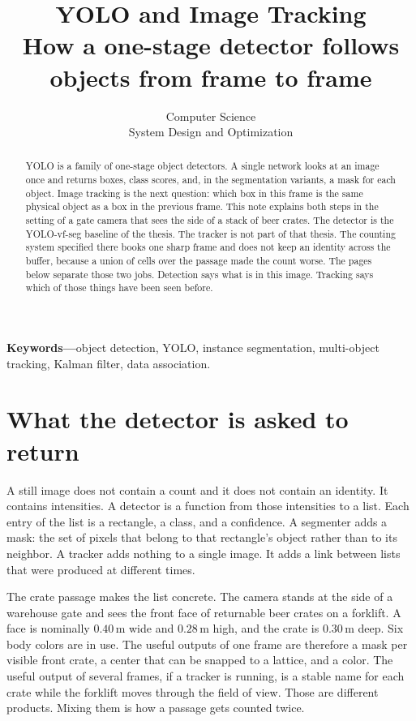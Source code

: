 \documentclass[11pt,a4paper]{article}
\title{YOLO and Image Tracking\\[0.4em]
\large How a one-stage detector follows objects from frame to frame}
\author{Computer Science\\ System Design and Optimization}
\date{}
\begin{document}
\maketitle
\thispagestyle{empty}
\vspace{-1.6em}
\noindent\textbf{Keywords---}object detection, YOLO, instance segmentation, multi-object tracking, Kalman filter, data association.

\begin{abstract}
\noindent
YOLO is a family of one-stage object detectors. A single network looks at an image once and returns boxes, class scores, and, in the segmentation variants, a mask for each object. Image tracking is the next question: which box in this frame is the same physical object as a box in the previous frame. This note explains both steps in the setting of a gate camera that sees the side of a stack of beer crates. The detector is the YOLO-vf-seg baseline of the thesis. The tracker is not part of that thesis. The counting system specified there books one sharp frame and does not keep an identity across the buffer, because a union of cells over the passage made the count worse. The pages below separate those two jobs. Detection says what is in this image. Tracking says which of those things have been seen before.
\end{abstract}

\section{What the detector is asked to return}

A still image does not contain a count and it does not contain an identity. It contains intensities. A detector is a function from those intensities to a list. Each entry of the list is a rectangle, a class, and a confidence. A segmenter adds a mask: the set of pixels that belong to that rectangle's object rather than to its neighbor. A tracker adds nothing to a single image. It adds a link between lists that were produced at different times.

The crate passage makes the list concrete. The camera stands at the side of a warehouse gate and sees the front face of returnable beer crates on a forklift. A face is nominally $0.40\,\mathrm{m}$ wide and $0.28\,\mathrm{m}$ high, and the crate is $0.30\,\mathrm{m}$ deep. Six body colors are in use. The useful outputs of one frame are therefore a mask per visible front crate, a center that can be snapped to a lattice, and a color. The useful output of several frames, if a tracker is running, is a stable name for each crate while the forklift moves through the field of view. Those are different products. Mixing them is how a passage gets counted twice.
\end{document}
